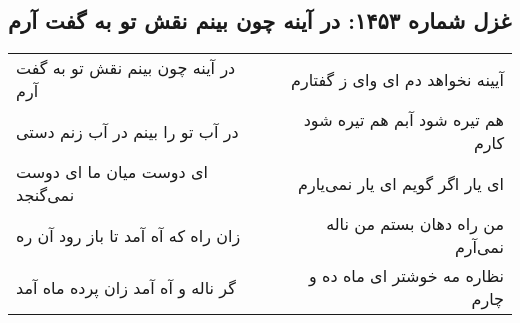 \begin{center}
\section*{غزل شماره ۱۴۵۳: در آینه چون بینم نقش تو به گفت آرم}
\label{sec:1453}
\begin{longtable}{l p{0.5cm} r}
در آینه چون بینم نقش تو به گفت آرم
&&
آیینه نخواهد دم ای وای ز گفتارم
\\
در آب تو را بینم در آب زنم دستی
&&
هم تیره شود آبم هم تیره شود کارم
\\
ای دوست میان ما ای دوست نمی‌گنجد
&&
ای یار اگر گویم ای یار نمی‌یارم
\\
زان راه که آه آمد تا باز رود آن ره
&&
من راه دهان بستم من ناله نمی‌آرم
\\
گر ناله و آه آمد زان پرده ماه آمد
&&
نظاره مه خوشتر ای ماه ده و چارم
\\
\end{longtable}
\end{center}
